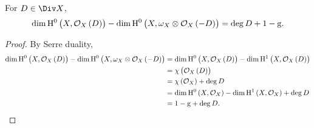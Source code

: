 \begin{theorem}
For $ D \in \Div X $,
$$ \dim \H^0\br{X, \OOO_X\br{D}} - \dim \H^0\br{X, \omega_X \otimes \OOO_X\br{-D}} = \deg D + 1 - \g. $$
\end{theorem}

\begin{proof}
By Serre duality,
\begin{align*}
\dim \H^0\br{X, \OOO_X\br{D}} - \dim \H^0\br{X, \omega_X \otimes \OOO_X\br{-D}}
& = \dim \H^0\br{X, \OOO_X\br{D}} - \dim \H^1\br{X, \OOO_X\br{D}} \\
& = \chi\br{\OOO_X\br{D}} \\
& = \chi\br{\OOO_X} + \deg D \\
& = \dim \H^0\br{X, \OOO_X} - \dim \H^1\br{X, \OOO_X} + \deg D \\
& = 1 - \g + \deg D.
\end{align*}
\end{proof}


